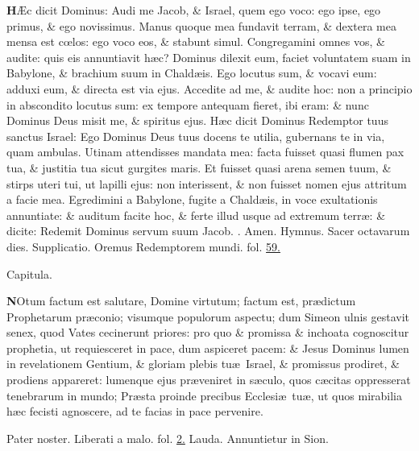 \documentclass[letter,11pt]{book}
\makeatletter
\DeclareRobustCommand{\Rbar}{\vers@resp{0pt}{R}}
\newcommand{\vers@resp@sym}{\raisebox{0.2ex}{\rotatebox[origin=c]{-20}{$\m@th\rceil$}}}
\newcommand{\vers@resp}[2]{%
  {\ooalign{\hidewidth\kern#1\vers@resp@sym\hidewidth\cr#2\cr}}%
}%
\def\R{\color{Red} \Rbar . \color{black}}
\makeatother
\begin{document}
\begin{multicols*}{2}
\lettrine[lines=2]{\bfseries \color{Red} H}{}\AE c dicit Dominus: Audi me Jacob, \& Israel, quem ego voco: ego ipse, ego primus, \& ego novissimus. Manus quoque mea fundavit terram, \& dextera mea mensa est c\oe los: ego voco eos, \& stabunt simul. Congregamini omnes vos, \& audite: quis eis annuntiavit h\ae c? Dominus dilexit eum, faciet voluntatem suam in Babylone, \& brachium suum in Chald\ae is. Ego locutus sum, \& vocavi eum: adduxi eum, \& directa est via ejus. Accedite ad me, \& audite hoc: non a principio in abscondito locutus sum: ex tempore antequam fieret, ibi eram: \& nunc Dominus Deus misit me, \& spiritus ejus. H\ae c dicit Dominus Redemptor tuus sanctus Israel: Ego Dominus Deus tuus docens te utilia, gubernans te in via, quam ambulas. Utinam attendisses mandata mea: facta fuisset quasi flumen pax tua, \& justitia tua sicut gurgites maris. Et fuisset quasi arena semen tuum, \& stirps uteri tui, ut lapilli ejus: non interissent, \& non fuisset nomen ejus attritum a facie mea. Egredimini a Babylone, fugite a Chald\ae is, in voce exultationis annuntiate: \& auditum facite hoc, \& ferte illud usque ad extremum terr\ae : \& dicite: Redemit Dominus servum suum Jacob. \R Amen.
\newline \color{Red} Hymnus. \color{black} Sacer octavarum dies.
\newline \color{Red} Supplicatio. \color{black} Oremus Redemptorem mundi. \color{Red} fol. \color{black} \hyperlink{page.59}{59.}
\vspace{-1.5em} \begin{center} \color{Red} Capitula. \color{black} \end{center} \vspace{-.5em}
\lettrine[lines=2]{\bfseries \color{Red} N}{}Otum factum est salutare, Domine virtutum; factum est, pr\ae dictum Prophetarum pr\ae conio; visumque populorum aspectu; dum Simeon ulnis gestavit senex, quod Vates cecinerunt priores: pro quo \& promissa \& inchoata cognoscitur prophetia, ut requiesceret in pace, dum aspiceret pacem: \& Jesus Dominus lumen in revelationem Gentium, \& gloriam plebis tu\ae \ Israel, \& promissus prodiret, \& prodiens appareret: lumenque ejus pr\ae veniret in s\ae culo, quos c\ae citas oppresserat tenebrarum in mundo; Pr\ae sta proinde precibus Ecclesi\ae \ tu\ae , ut quos mirabilia h\ae c fecisti agnoscere, ad te facias in pace pervenire.
\par Pater noster. Liberati a malo. \color{Red} fol. \color{black} \hyperlink{page.2}{2.}
\newline \color{Red} Lauda. \color{black} Annuntietur in Sion.

\end{multicols*}
\end{document}
